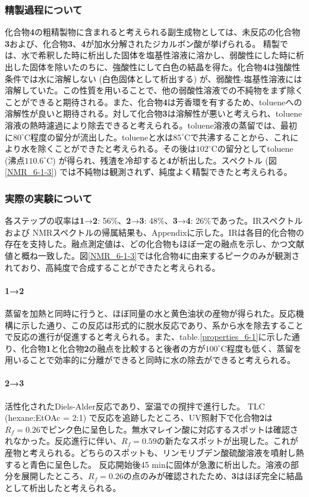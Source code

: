 \documentclass{ltjsarticle}
\theoremstyle{definition}
\numberwithin{equation}{section}
\newcommand{\D}{^\circ\text{C}}
\begin{document}
\subsubsection{精製過程について}
化合物\textbf{4}の粗精製物に含まれると考えられる副生成物としては、未反応の化合物\textbf{3}および、化合物\textbf{3}、\textbf{4}が加水分解されたジカルボン酸が挙げられる。
精製では、水で希釈した時に析出した固体を塩基性溶液に溶かし、弱酸性にした時に析出した固体を除いたのちに、強酸性にして白色の結晶を得た。化合物\textbf{4}は強酸性条件では水に溶解しない (白色固体として析出する) が、弱酸性-塩基性溶液には溶解していた。この性質を用いることで、他の弱酸性溶液での不純物をまず除くことができると期待される。また、化合物\textbf{4}は芳香環を有するため、tolueneへの溶解性が良いと期待される。対して化合物\textbf{3}は溶解性が悪いと考えられ、toluene溶液の熱時濾過により除去できると考えられる。toluene溶液の蒸留では、最初に$80\D$程度の留分が流出した。tolueneと水は$85\D$で共沸する\cite{solvent_bp}ことから、これにより水を除くことができたと考えられる。その後は$102\D$の留分としてtoluene (沸点$110.6\D$) が得られ、残渣を冷却すると\textbf{4}が析出した。スペクトル (図\ref{NMR_6-1-3}) では不純物は観測されず、純度よく精製できたと考えられる。

\subsubsection{実際の実験について}
各ステップの収率は\textbf{1}→\textbf{2}: 56\%、\textbf{2}→\textbf{3}: 48\%、\textbf{3}→\textbf{4}: 26\%であった。IRスペクトルおよび NMRスペクトルの帰属結果も、Appendixに示した。IRは各目的化合物の存在を支持した。融点測定値は、どの化合物もほぼ一定の融点を示し、かつ文献値と概ね一致した。図\ref{NMR_6-1-3}では化合物\textbf{4}に由来するピークのみが観測されており、高純度で合成することができたと考えられる。

\paragraph{\textbf{1}→\textbf{2}}
蒸留を加熱と同時に行うと、ほぼ同量の水と黄色油状の産物が得られた。反応機構に示した通り、この反応は形式的に脱水反応であり、系から水を除去することで反応の進行が促進すると考えられる。また、table.\ref{properties_6-1}に示した通り、化合物\textbf{1}と化合物\textbf{2}の融点を比較すると後者の方が$100\D$程度も低く、蒸留を用いることで効率的に分離ができると同時に水の除去ができると考えられる。

\paragraph{\textbf{2}→\textbf{3}}
活性化されたDiels-Alder反応であり、室温での撹拌で進行した。
TLC (hexane:EtOAc = 2:1) で反応を追跡したところ、UV照射下で化合物\textbf{2}は$R_f= 0.26$でピンク色に呈色した。無水マレイン酸に対応するスポットは確認されなかった。反応進行に伴い、$R_f = 0.59$の新たなスポットが出現した。これが産物と考えられる。どちらのスポットも、リンモリブデン酸硫酸溶液を噴射し熱すると青色に呈色した。
反応開始後45 minに固体が急激に析出した。溶液の部分を展開したところ、$R_f= 0.26$の点のみが確認されたため、\textbf{3}はほぼ完全に結晶として析出したと考えられる。
\end{document}
